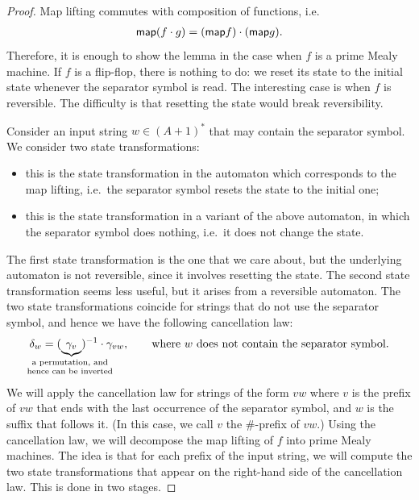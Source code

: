 \begin{proof}
    Map lifting commutes with composition of functions, i.e.
    \begin{align*}
    \mathsf{map}(f \cdot g) = (\mathsf{map} f) \cdot (\mathsf{map} g).
    \end{align*}
    Therefore, it is enough to show the lemma in the case when $f$ is a prime Mealy machine. If $f$ is a flip-flop, there is nothing to do:  we reset its state to the initial state whenever the separator symbol is read. The interesting case is when $f$ is reversible. The difficulty is that resetting the state would break reversibility. 

    Consider an input string $w \in (A+1)^*$ that may contain the separator symbol. We consider two state transformations:
    \begin{itemize}
        \item[$\delta_w$] this is the state transformation in the automaton which corresponds to the  map lifting, i.e.~the separator symbol resets the state to the initial one;
        \item[$\gamma_w$] this is the state transformation in a variant of the above automaton, in which the separator symbol does nothing, i.e.~it does not change the state.
    \end{itemize} 
    The first state transformation is the one that we care about, but  the underlying automaton is not reversible, since it involves resetting the state. The second state transformation seems less useful, but it arises from a reversible automaton. The two state transformations coincide for strings that do not use the separator symbol, and hence we have the following cancellation law: 
    \begin{align}\label{eq:cancellation}
    \delta_{w} = (\myunderbrace{\gamma_{v}}{a permutation, and \\ hence can be inverted})^{-1}  \cdot \gamma_{vw}, 
    \qquad \text{where $w$ does not contain the separator symbol.}
    \end{align}
    We will apply the cancellation law for strings of the form $vw$ where $v$ is the prefix of $vw$ that ends with the last occurrence of the separator symbol, and $w$ is the suffix that follows it. (In this case, we call $v$ the $\#$-prefix of $vw$.)
    Using the  cancellation law, we will  decompose the map lifting of $f$ into prime Mealy machines. The idea is that for each prefix of the input string, we  will compute the two state transformations that appear on the right-hand side of the cancellation law.  This is done in two stages.

\end{proof}
